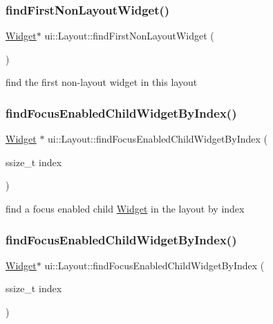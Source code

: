 \subsubsection{\texorpdfstring{find\+First\+Non\+Layout\+Widget()}{findFirstNonLayoutWidget()}\hspace{0.1cm}{\footnotesize\ttfamily [2/2]}}
{\footnotesize\ttfamily \hyperlink{classui_1_1Widget}{Widget}$\ast$ ui\+::\+Layout\+::find\+First\+Non\+Layout\+Widget (\begin{DoxyParamCaption}{ }\end{DoxyParamCaption})\hspace{0.3cm}{\ttfamily [protected]}}

find the first non-\/layout widget in this layout \mbox{\label{classui_1_1Layout_a6b9e5fe4f9a42d75be143446661d7b24}} 
\subsubsection{\texorpdfstring{find\+Focus\+Enabled\+Child\+Widget\+By\+Index()}{findFocusEnabledChildWidgetByIndex()}\hspace{0.1cm}{\footnotesize\ttfamily [1/2]}}
{\footnotesize\ttfamily \hyperlink{classui_1_1Widget}{Widget} $\ast$ ui\+::\+Layout\+::find\+Focus\+Enabled\+Child\+Widget\+By\+Index (\begin{DoxyParamCaption}\item[{ssize\+\_\+t}]{index }\end{DoxyParamCaption})\hspace{0.3cm}{\ttfamily [protected]}}

find a focus enabled child \hyperlink{classui_1_1Widget}{Widget} in the layout by index \mbox{\label{classui_1_1Layout_ab470e2f8d9a62e94278108dec416d589}} 
\subsubsection{\texorpdfstring{find\+Focus\+Enabled\+Child\+Widget\+By\+Index()}{findFocusEnabledChildWidgetByIndex()}\hspace{0.1cm}{\footnotesize\ttfamily [2/2]}}
{\footnotesize\ttfamily \hyperlink{classui_1_1Widget}{Widget}$\ast$ ui\+::\+Layout\+::find\+Focus\+Enabled\+Child\+Widget\+By\+Index (\begin{DoxyParamCaption}\item[{ssize\+\_\+t}]{index }\end{DoxyParamCaption})\hspace{0.3cm}{\ttfamily [protected]}}

